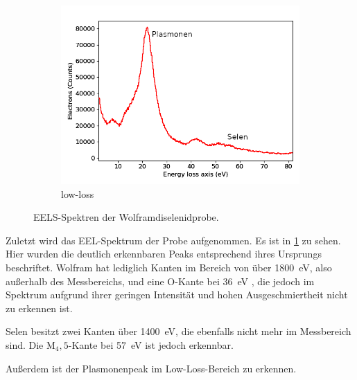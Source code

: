 \begin{figure}[H]
\begin{subfigure}[b]{0.7\textwidth}
				\includegraphics[width= 1 \linewidth]{img/tem_mark}
				\caption{low-loss}
	\end{subfigure}
		\label{fig:eels}
		\caption{
      EELS-Spektren der Wolframdiselenidprobe.
			}
	\end{figure}

  Zuletzt wird das EEL-Spektrum der Probe aufgenommen.
  Es ist in \cref{fig:eels} zu sehen.
  Hier wurden die deutlich erkennbaren Peaks entsprechend ihres Ursprungs beschriftet.
  Wolfram hat lediglich Kanten im Bereich von über \SI{1800}{eV}, also außerhalb des Messbereichs, und eine O-Kante bei \SI{36}{eV} \cite{eelsinfo}, die jedoch im Spektrum aufgrund ihrer geringen Intensität und hohen Ausgeschmiertheit nicht zu erkennen ist.

  Selen besitzt zwei Kanten über \SI{1400}{eV}, die ebenfalls nicht mehr im Messbereich sind.
  Die M$_4,5$-Kante bei \SI{57}{eV} ist jedoch erkennbar.

  Außerdem ist der Plasmonenpeak im Low-Loss-Bereich zu erkennen.


